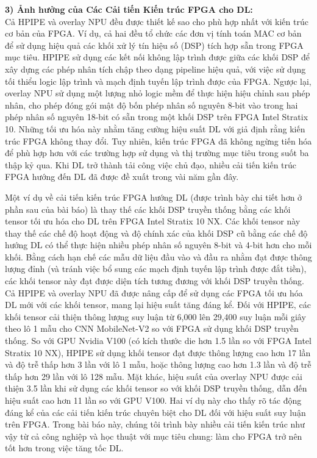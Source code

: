 \documentclass[a4paper]{article}
\begin{document}
\textbf{3) Ảnh hưởng của Các Cải tiến Kiến trúc FPGA cho DL:} \\
    Cả HPIPE và overlay NPU đều được thiết kế sao cho phù hợp nhất với kiến trúc cơ bản của FPGA. Ví dụ, cả hai đều tổ chức các đơn vị tính toán MAC cơ bản để sử dụng hiệu quả các khối xử lý tín hiệu số (DSP) tích hợp sẵn trong FPGA mục tiêu. HPIPE sử dụng các kết nối không lập trình được giữa các khối DSP để xây dựng các phép nhân tích chập theo dạng pipeline hiệu quả, với việc sử dụng tối thiểu logic lập trình và mạch định tuyến lập trình được của FPGA. Ngược lại, overlay NPU sử dụng một lượng nhỏ logic mềm để thực hiện hiệu chỉnh sau phép nhân, cho phép đóng gói mật độ bốn phép nhân số nguyên 8-bit vào trong hai phép nhân số nguyên 18-bit có sẵn trong một khối DSP trên FPGA Intel Stratix 10. Những tối ưu hóa này nhằm tăng cường hiệu suất DL với giả định rằng kiến trúc FPGA không thay đổi. Tuy nhiên, kiến trúc FPGA đã không ngừng tiến hóa để phù hợp hơn với các trường hợp sử dụng và thị trường mục tiêu trong suốt ba thập kỷ qua. Khi DL trở thành tải công việc chủ đạo, nhiều cải tiến kiến trúc FPGA hướng đến DL đã được đề xuất trong vài năm gần đây.
    
    Một ví dụ về cải tiến kiến trúc FPGA hướng DL (được trình bày chi tiết hơn ở phần sau của bài báo) là thay thế các khối DSP truyền thống bằng các khối tensor tối ưu hóa cho DL trên FPGA Intel Stratix 10 NX. Các khối tensor này thay thế các chế độ hoạt động và độ chính xác của khối DSP cũ bằng các chế độ hướng DL có thể thực hiện nhiều phép nhân số nguyên 8-bit và 4-bit hơn cho mỗi khối. Bằng cách hạn chế các mẫu dữ liệu đầu vào và đầu ra nhằm đạt được thông lượng đỉnh (và tránh việc bổ sung các mạch định tuyến lập trình được đắt tiền), các khối tensor này đạt được diện tích tương đương với khối DSP truyền thống. Cả HPIPE và overlay NPU đã được nâng cấp để sử dụng các FPGA tối ưu hóa DL mới với các khối tensor, mang lại hiệu suất tăng đáng kể. Đối với HPIPE, các khối tensor cải thiện thông lượng suy luận từ 6,000 lên 29,400 suy luận mỗi giây theo lô 1 mẫu cho CNN MobileNet-V2 so với FPGA sử dụng khối DSP truyền thống. So với GPU Nvidia V100 (có kích thước die hơn 1.5 lần so với FPGA Intel Stratix 10 NX), HPIPE sử dụng khối tensor đạt được thông lượng cao hơn 17 lần và độ trễ thấp hơn 3 lần với lô 1 mẫu, hoặc thông lượng cao hơn 1.3 lần và độ trễ thấp hơn 29 lần với lô 128 mẫu. Mặt khác, hiệu suất của overlay NPU được cải thiện 3.5 lần khi sử dụng các khối tensor so với khối DSP truyền thống, dẫn đến hiệu suất cao hơn 11 lần so với GPU V100. Hai ví dụ này cho thấy rõ tác động đáng kể của các cải tiến kiến trúc chuyên biệt cho DL đối với hiệu suất suy luận trên FPGA. Trong bài báo này, chúng tôi trình bày nhiều cải tiến kiến trúc như vậy từ cả công nghiệp và học thuật với mục tiêu chung: làm cho FPGA trở nên tốt hơn trong việc tăng tốc DL.
\end{document}
